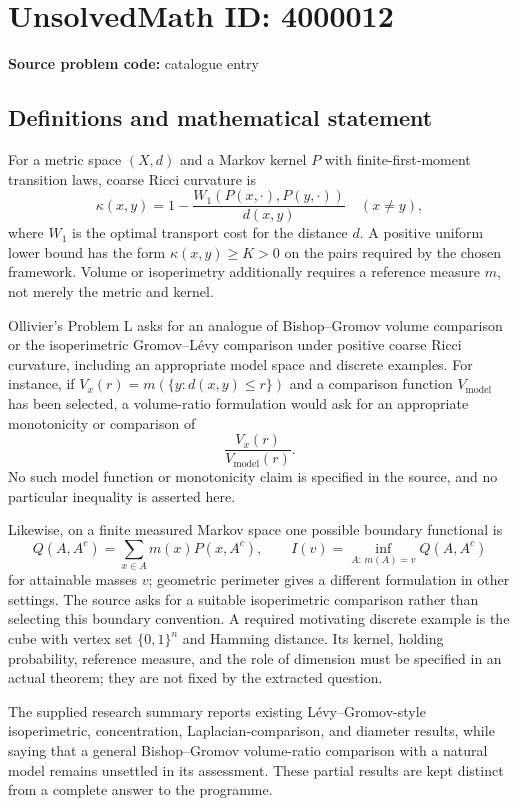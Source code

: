 \documentclass[11pt]{article}
\begin{document}
\section*{UnsolvedMath ID: 4000012}
\textbf{Source problem code:} catalogue entry
\subsection{Definitions and mathematical statement}
For a metric space \((X,d)\) and a Markov kernel \(P\) with finite-first-moment transition laws, coarse Ricci curvature is
\[
\kappa(x,y)=1-\frac{W_1(P(x,\cdot),P(y,\cdot))}{d(x,y)}\quad(x\ne y),
\]
where \(W_1\) is the optimal transport cost for the distance \(d\). A positive uniform lower bound has the form \(\kappa(x,y)\ge K>0\) on the pairs required by the chosen framework. Volume or isoperimetry additionally requires a reference measure \(m\), not merely the metric and kernel.

Ollivier's Problem L asks for an analogue of Bishop--Gromov volume comparison or the isoperimetric Gromov--Lévy comparison under positive coarse Ricci curvature, including an appropriate model space and discrete examples. For instance, if \(V_x(r)=m(\{y:d(x,y)\le r\})\) and a comparison function \(V_{\mathrm{model}}\) has been selected, a volume-ratio formulation would ask for an appropriate monotonicity or comparison of
\[
\frac{V_x(r)}{V_{\mathrm{model}}(r)}.
\]
No such model function or monotonicity claim is specified in the source, and no particular inequality is asserted here.

Likewise, on a finite measured Markov space one possible boundary functional is
\[
Q(A,A^c)=\sum_{x\in A}m(x)P(x,A^c),\qquad
I(v)=\inf_{A:\,m(A)=v}Q(A,A^c)
\]
for attainable masses \(v\); geometric perimeter gives a different formulation in other settings. The source asks for a suitable isoperimetric comparison rather than selecting this boundary convention. A required motivating discrete example is the cube with vertex set \(\{0,1\}^n\) and Hamming distance. Its kernel, holding probability, reference measure, and the role of dimension must be specified in an actual theorem; they are not fixed by the extracted question.

The supplied research summary reports existing Lévy--Gromov-style isoperimetric, concentration, Laplacian-comparison, and diameter results, while saying that a general Bishop--Gromov volume-ratio comparison with a natural model remains unsettled in its assessment. These partial results are kept distinct from a complete answer to the programme.
\end{document}
